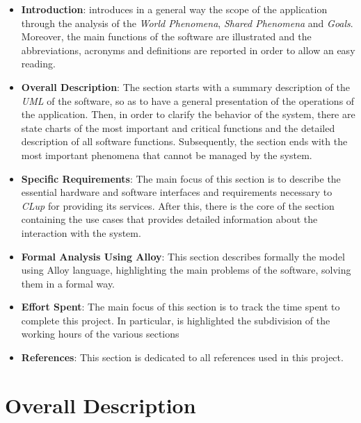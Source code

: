 \documentclass{article}
\begin{document}
	\begin{itemize}
		
		\item {\bfseries Introduction}: introduces in a general way the scope of the application through the analysis of the \emph{World Phenomena}, \emph{Shared Phenomena} and \emph{Goals}. Moreover, the main functions of the software are illustrated and the abbreviations, acronyms and definitions are reported in order to allow an easy reading.
		
		\item {\bfseries Overall Description}: The section starts with a summary description of the \emph{UML} of the software, so as to have a general presentation of the operations of the application. Then, in order to clarify the behavior of the system, there are state charts of the most important and critical functions and the detailed description of all software functions. Subsequently, the section ends with the most important phenomena that cannot be managed by the system.
		
		\item {\bfseries Specific Requirements}: The main focus of this section is to describe the essential hardware and software interfaces and requirements necessary to \emph{CLup} for providing its services. After this, there is the core of the section containing the use cases that provides detailed information about the interaction with the system.
		
		\item {\bfseries Formal Analysis Using Alloy}: This section describes formally the model using Alloy language, highlighting the main problems of the software, solving them in a formal way.
		
		\item {\bfseries Effort Spent}: The main focus of this section is to track the time spent to complete this project. In particular, is highlighted the subdivision of the working hours of the various sections
		
		\item {\bfseries References}: This section is dedicated to all references used in this project.
		
	\end{itemize}
	
\newpage	

\section{Overall Description}
\end{document}
